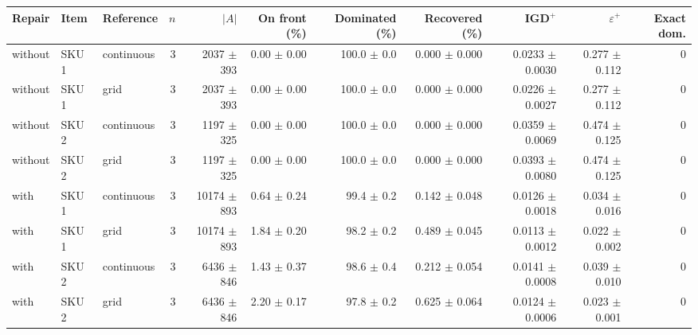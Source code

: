 \begin{tabular}{@{}lllrrrrrrrr@{}}
\toprule
Repair & Item & Reference & $n$ & $|A|$ & On front (\%) & Dominated (\%) & Recovered (\%) & IGD$^+$ & $\varepsilon^+$ & Exact dom. \\
\midrule
without & SKU 1 & continuous & 3 & 2037 $\pm$ 393 & 0.00 $\pm$ 0.00 & 100.0 $\pm$ 0.0 & 0.000 $\pm$ 0.000 & 0.0233 $\pm$ 0.0030 & 0.277 $\pm$ 0.112 & 0 \\
without & SKU 1 & grid & 3 & 2037 $\pm$ 393 & 0.00 $\pm$ 0.00 & 100.0 $\pm$ 0.0 & 0.000 $\pm$ 0.000 & 0.0226 $\pm$ 0.0027 & 0.277 $\pm$ 0.112 & 0 \\
without & SKU 2 & continuous & 3 & 1197 $\pm$ 325 & 0.00 $\pm$ 0.00 & 100.0 $\pm$ 0.0 & 0.000 $\pm$ 0.000 & 0.0359 $\pm$ 0.0069 & 0.474 $\pm$ 0.125 & 0 \\
without & SKU 2 & grid & 3 & 1197 $\pm$ 325 & 0.00 $\pm$ 0.00 & 100.0 $\pm$ 0.0 & 0.000 $\pm$ 0.000 & 0.0393 $\pm$ 0.0080 & 0.474 $\pm$ 0.125 & 0 \\
with & SKU 1 & continuous & 3 & 10174 $\pm$ 893 & 0.64 $\pm$ 0.24 & 99.4 $\pm$ 0.2 & 0.142 $\pm$ 0.048 & 0.0126 $\pm$ 0.0018 & 0.034 $\pm$ 0.016 & 0 \\
with & SKU 1 & grid & 3 & 10174 $\pm$ 893 & 1.84 $\pm$ 0.20 & 98.2 $\pm$ 0.2 & 0.489 $\pm$ 0.045 & 0.0113 $\pm$ 0.0012 & 0.022 $\pm$ 0.002 & 0 \\
with & SKU 2 & continuous & 3 & 6436 $\pm$ 846 & 1.43 $\pm$ 0.37 & 98.6 $\pm$ 0.4 & 0.212 $\pm$ 0.054 & 0.0141 $\pm$ 0.0008 & 0.039 $\pm$ 0.010 & 0 \\
with & SKU 2 & grid & 3 & 6436 $\pm$ 846 & 2.20 $\pm$ 0.17 & 97.8 $\pm$ 0.2 & 0.625 $\pm$ 0.064 & 0.0124 $\pm$ 0.0006 & 0.023 $\pm$ 0.001 & 0 \\
\bottomrule
\end{tabular}
